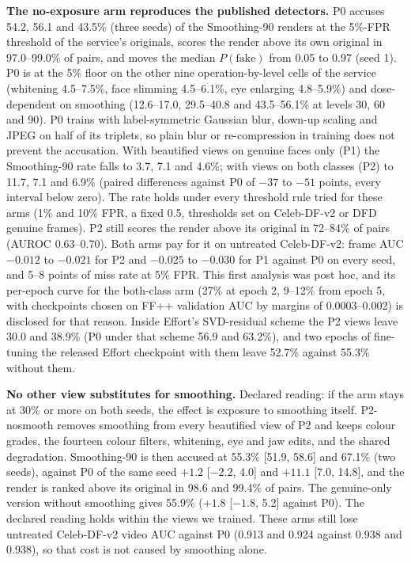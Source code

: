 \documentclass[10pt]{article}
\begin{document}
\textbf{The no-exposure arm reproduces the published detectors.} P0 accuses 54.2, 56.1 and 43.5\% (three seeds) of the Smoothing-90
renders at the 5\%-FPR threshold of the service's originals, scores the render above its own original in 97.0--99.0\% of pairs,
and moves the median $P(\text{fake})$ from 0.05 to 0.97 (seed 1). P0 is at the 5\% floor on the other nine operation-by-level cells
of the service (whitening 4.5--7.5\%, face slimming 4.5--6.1\%, eye enlarging 4.8--5.9\%) and dose-dependent on smoothing
(12.6--17.0, 29.5--40.8 and 43.5--56.1\% at levels 30, 60 and 90). P0 trains with label-symmetric Gaussian blur, down-up scaling
and JPEG on half of its triplets, so plain blur or re-compression in training does not prevent the accusation. With beautified
views on genuine faces only (P1) the Smoothing-90 rate falls to 3.7, 7.1 and 4.6\%; with views on both classes (P2) to 11.7, 7.1
and 6.9\% (paired differences against P0 of $-37$ to $-51$ points, every interval below zero). The rate holds under every
threshold rule tried for these arms (1\% and 10\% FPR, a fixed 0.5, thresholds set on Celeb-DF-v2 or DFD genuine frames). P2 still
scores the render above its original in 72--84\% of pairs (AUROC 0.63--0.70). Both arms pay for it on untreated Celeb-DF-v2:
frame AUC $-0.012$ to $-0.021$ for P2 and $-0.025$ to $-0.030$ for P1 against P0 on every seed, and 5--8 points of miss rate at 5\%
FPR. This first analysis was post hoc, and its per-epoch curve for the both-class arm (27\% at epoch 2, 9--12\% from epoch 5, with
checkpoints chosen on FF++ validation AUC by margins of 0.0003--0.002) is disclosed for that reason. Inside Effort's SVD-residual
scheme the P2 views leave 30.0 and 38.9\% (P0 under that scheme 56.9 and 63.2\%), and two epochs of fine-tuning the released Effort
checkpoint with them leave 52.7\% against 55.3\% without them.

\textbf{No other view substitutes for smoothing.} Declared reading: if the arm stays at 30\% or more on both seeds, the effect is
exposure to smoothing itself. P2-nosmooth removes smoothing from every beautified view of P2 and keeps colour grades, the fourteen
colour filters, whitening, eye and jaw edits, and the shared degradation. Smoothing-90 is then accused at 55.3\% [51.9, 58.6] and
67.1\% (two seeds), against P0 of the same seed $+1.2$ [$-2.2$, 4.0] and $+11.1$ [7.0, 14.8], and the render is ranked above its
original in 98.6 and 99.4\% of pairs. The genuine-only version without smoothing gives 55.9\% ($+1.8$ [$-1.8$, 5.2] against P0).
The declared reading holds within the views we trained. These arms still lose untreated Celeb-DF-v2 video AUC against P0 (0.913
and 0.924 against 0.938 and 0.938), so that cost is not caused by smoothing alone.
\end{document}
